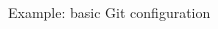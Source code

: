 \begin{frame}[fragile]{Example: basic Git configuration}
  \begin{columns}[t]
    \begin{column}{0.5\textwidth}
      
    \end{column}
    \begin{column}{0.5\textwidth}
      
    \end{column}
  \end{columns}
\end{frame}
